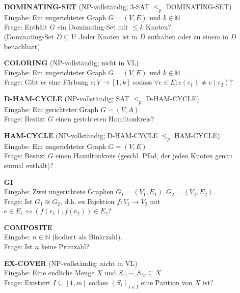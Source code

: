\documentclass[a4paper,graphics,11pt]{article}
\begin{document}
\strut

\textbf{DOMINATING-SET} (\textsf{NP}-vollständig; 3-SAT $\leq_p$ DOMINATING-SET)
\\[5pt]
Eingabe: Ein ungerichteter Graph $G = (V,E)$ und $k \in \mathbb{N}$
\\[5pt]
Frage: Enthält $G$ ein Dominating-Set mit $\leq k$ Knoten?\\[5pt]
(Dominating-Set $D \subseteq V$: Jeder Knoten ist in $D$ enthalten oder zu einem in $D$ benachbart).

\newpage

\textbf{COLORING} (\textsf{NP}-vollständig; nicht in VL)
\\[5pt]
Eingabe: Ein ungerichteter Graph $G = (V,E)$ und $k \in \mathbb{N}$
\\[5pt]
Frage: Gibt es eine Färbung $c : V \to [1,k]$ sodass $\forall e \in E : c(e_1) \neq c(e_2)$?

\strut

\textbf{D-HAM-CYCLE} (\textsf{NP}-vollständig; SAT $\leq_p$ D-HAM-CYCLE)
\\[5pt]
Eingabe: Ein gerichteter Graph $G = (V,A)$
\\[5pt]
Frage: Besitzt $G$ einen gerichteten Hamiltonkreis?

\strut

\textbf{HAM-CYCLE} (\textsf{NP}-vollständig; D-HAM-CYCLE $\leq_p$ HAM-CYCLE)
\\[5pt]
Eingabe: Ein ungerichteter Graph $G = (V,E)$
\\[5pt]
Frage: Besitzt $G$ einen Hamiltonkreis (geschl. Pfad, der jeden Knoten genau einmal enthält)?

\strut

\textbf{GI}
\\[5pt]
Eingabe: Zwei ungerichtete Graphen $G_1= (V_1,E_1), G_2=(V_2,E_2)$.
\\[5pt]
Frage: Ist $G_1 \cong G_2$, d.h. ex Bijektion $f:V_1 \to V_2$ mit $e \in E_1 \iff (f(e_1),f(e_2)) \in E_2$?

\strut

\textbf{COMPOSITE}
\\[5pt]
Eingabe: $n \in \mathbb{N}$ (kodiert als Binärzahl).
\\[5pt]
Frage: Ist $n$ keine Primzahl?

\strut

\textbf{EX-COVER} (\textsf{NP}-vollständig; nicht in VL)
\\[5pt]
Eingabe: Eine endliche Menge $X$ und $S_1,\cdots,S_M \subseteq X$
\\[5pt]
Frage: Existiert $I \subseteq [1,m]$ sodass $(S_i)_{i \in I}$ eine Parition von $X$ ist?
\end{document}
